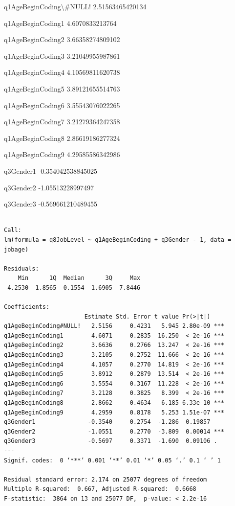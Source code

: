 \documentclass[11pt]{article}
\begin{document}
    \begin{description*}
\item[q1AgeBeginCoding\textbackslash{}\#NULL!] 2.51563465420134
\item[q1AgeBeginCoding1] 4.6070833213764
\item[q1AgeBeginCoding2] 3.66358274809102
\item[q1AgeBeginCoding3] 3.21049955987861
\item[q1AgeBeginCoding4] 4.10569811620738
\item[q1AgeBeginCoding5] 3.89121655514763
\item[q1AgeBeginCoding6] 3.55543076022265
\item[q1AgeBeginCoding7] 3.21279364247358
\item[q1AgeBeginCoding8] 2.86619186277324
\item[q1AgeBeginCoding9] 4.29585586342986
\item[q3Gender1] -0.354042538845025
\item[q3Gender2] -1.05513228997497
\item[q3Gender3] -0.569661210489455
\end{description*}


    
    
    \begin{verbatim}

Call:
lm(formula = q8JobLevel ~ q1AgeBeginCoding + q3Gender - 1, data = jobage)

Residuals:
    Min      1Q  Median      3Q     Max 
-4.2530 -1.8565 -0.1554  1.6905  7.8446 

Coefficients:
                       Estimate Std. Error t value Pr(>|t|)    
q1AgeBeginCoding#NULL!   2.5156     0.4231   5.945 2.80e-09 ***
q1AgeBeginCoding1        4.6071     0.2835  16.250  < 2e-16 ***
q1AgeBeginCoding2        3.6636     0.2766  13.247  < 2e-16 ***
q1AgeBeginCoding3        3.2105     0.2752  11.666  < 2e-16 ***
q1AgeBeginCoding4        4.1057     0.2770  14.819  < 2e-16 ***
q1AgeBeginCoding5        3.8912     0.2879  13.514  < 2e-16 ***
q1AgeBeginCoding6        3.5554     0.3167  11.228  < 2e-16 ***
q1AgeBeginCoding7        3.2128     0.3825   8.399  < 2e-16 ***
q1AgeBeginCoding8        2.8662     0.4634   6.185 6.33e-10 ***
q1AgeBeginCoding9        4.2959     0.8178   5.253 1.51e-07 ***
q3Gender1               -0.3540     0.2754  -1.286  0.19857    
q3Gender2               -1.0551     0.2770  -3.809  0.00014 ***
q3Gender3               -0.5697     0.3371  -1.690  0.09106 .  
---
Signif. codes:  0 ‘***’ 0.001 ‘**’ 0.01 ‘*’ 0.05 ‘.’ 0.1 ‘ ’ 1

Residual standard error: 2.174 on 25077 degrees of freedom
Multiple R-squared:  0.667,	Adjusted R-squared:  0.6668 
F-statistic:  3864 on 13 and 25077 DF,  p-value: < 2.2e-16

    \end{verbatim}
\end{document}
